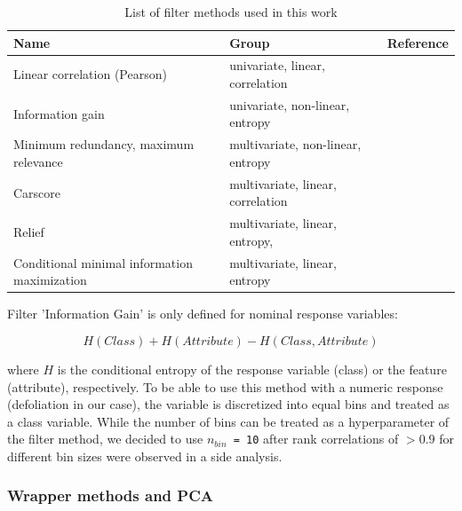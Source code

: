 \documentclass[letterpaper, peerreview]{IEEEtran}
\begin{document}
\begin{table}[b!]
\centering
\caption[t]{List of filter methods used in this work}
\begingroup\footnotesize
\begin{adjustbox}{width={0.48\textwidth},totalheight={\textheight},keepaspectratio}
	\begin{tabular}{lll}
		\\
		Name                                         & Group                             & Reference          \\
		\toprule
		Linear correlation (Pearson)                 & univariate, linear, correlation   & \cite{pearson1901} \\
		Information gain                             & univariate, non-linear, entropy   & \cite{quinlan1986} \\
		Minimum redundancy, maximum relevance        & multivariate, non-linear, entropy & \cite{zhao2013}    \\
		Carscore                                     & multivariate, linear, correlation & \cite{zuber2011}   \\
		Relief                                       & multivariate, linear, entropy,    & \cite{kira1992}    \\
		Conditional minimal information maximization & multivariate, linear, entropy     & \cite{fleuret2004}
	\end{tabular}
\end{adjustbox}
\endgroup\label{tab:filter-methods}
\end{table}

\noindent Filter 'Information Gain' is only defined for nominal response variables:

\begin{equation}
	H(Class) + H(Attribute) - H(Class, Attribute)
\end{equation}

where \(H\) is the conditional entropy of the response variable (class) or the feature (attribute), respectively.
To be able to use this method with a numeric response (defoliation in our case), the variable is discretized into equal bins and treated as a class variable.
While the number of bins can be treated as a hyperparameter of the filter method, we decided to use \texttt{\(n_{bin}\) = 10} after rank correlations of $> 0.9$ for different bin sizes were observed in a side analysis.

\subsubsection{Wrapper methods and PCA}
\end{document}
